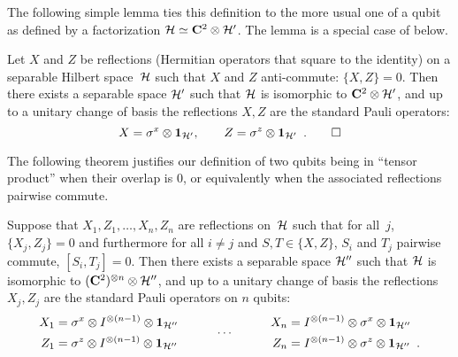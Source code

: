 \documentclass[preprintnumbers,11pt,onecolumn]{article}
\begin{document}
The following simple lemma ties this definition to the more usual one of a qubit as defined by a factorization ${\mathcal H} \simeq {\bf C}^2 \otimes {\mathcal H}'$.  The lemma is a special case of  below.  

\begin{lemma} \label{t:whatisaqubit}
Let $X$ and $Z$ be reflections (Hermitian operators that square to the identity) on a separable Hilbert space~${\mathcal H}$ such that $X$ and $Z$ anti-commute: $\{X, Z\} = 0$.  Then there exists a separable space ${\mathcal H}'$ such that ${\mathcal H}$ is isomorphic to ${\bf C}^2\otimes {\mathcal H}'$, and up to a unitary change of basis the reflections $X, Z$ are the standard Pauli operators: 
\begin{equation*}
X = \sigma^x \otimes \boldsymbol{1}_{{\mathcal H}'}, \qquad Z = \sigma^z \otimes \boldsymbol{1}_{{\mathcal H}'}
 \enspace .
\qedhere
\end{equation*}
\end{lemma}

The following theorem justifies our definition of two qubits being in ``tensor product'' when their overlap is $0$, or equivalently when the associated reflections pairwise commute.  

\begin{theorem} \label{t:whatismanyqubits}
Suppose that $X_1, Z_1, \ldots, X_n, Z_n$ are reflections on~${\mathcal H}$ such that for all~$j$, $\{X_j, Z_j\} = 0$ and furthermore for all $i \neq j$ and $S,T\in\{X,Z\}$, $S_i$ and $T_j$ pairwise commute, $[S_i, T_j] = 0$.  
Then there exists a separable space ${\mathcal H}''$ such that ${\mathcal H}$ is isomorphic to $({\bf C}^2)^{\otimes n} \otimes {\mathcal H}''$, and up to a unitary change of basis the reflections $X_j, Z_j$ are the standard Pauli operators on $n$ qubits: 
\begin{equation*}
\begin{split}
X_1 &= \sigma^x \otimes I^{\otimes (n-1)} \otimes \boldsymbol{1}_{{\mathcal H}''} \\
Z_1 &= \sigma^z \otimes I^{\otimes (n-1)} \otimes \boldsymbol{1}_{{\mathcal H}''}
\end{split}
\qquad\quad \cdots \qquad\quad
\begin{split}
X_n &= I^{\otimes (n-1)} \otimes \sigma^x \otimes \boldsymbol{1}_{{\mathcal H}''} \\
Z_n &= I^{\otimes (n-1)} \otimes \sigma^z \otimes \boldsymbol{1}_{{\mathcal H}''}
 \enspace . 
\end{split}
\end{equation*}
\end{theorem}
\end{document}

